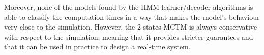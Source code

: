 Moreover, none of the models found by the HMM learner/decoder algorithms is able
to classify the computation times in a way that makes the model's behaviour very
close to the simulation. However, the 2-states MCTM is always conservative
with respect to the simulation, meaning that it provides stricter guarantees and
that it can be used in practice to design a real-time system.
